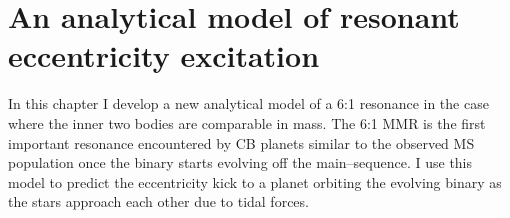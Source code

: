 \documentclass[ twoside,openright,titlepage,numbers=noenddot,headinclude,%
                footinclude=true,cleardoublepage=empty,abstractoff, %
                BCOR=5mm,paper=a4,fontsize=11pt,%
                american,%
                ]{scrreprt}
\begin{document}
\clearpage
\chapter{An analytical model of resonant eccentricity excitation}
\label{ch:analytical_model}
In this chapter I develop a new analytical model of a 6:1 resonance in the case 
where the inner two bodies are 
comparable in mass. The 6:1 MMR is the first important resonance encountered
by CB planets similar to the observed MS population once the 
binary starts evolving off the main--sequence. I use this 
model to predict the eccentricity kick to a planet orbiting the evolving
binary as the stars approach each other due to tidal forces. 
\end{document}
